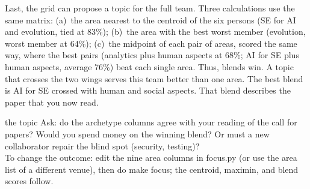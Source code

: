 Last, the grid can propose a topic for the full team.
Three calculations use the same matrix: (a)~the area nearest to the
centroid of the six persons (SE for AI and evolution, tied at 83\%);
(b)~the area with the best worst member (evolution, worst member at
64\%); (c)~the midpoint of each pair of areas, scored the same way,
where the best pairs (analytics plus human aspects at 68\%; AI for SE
plus human aspects, average 76\%) beat each single area.
Thus, blends win.
A topic that crosses the two wings serves this team better than one
area.
The best blend is AI for SE crossed with human and social aspects.
That blend describes the paper that you now read.

\begin{pause}{the topic}
Ask: do the archetype columns agree with your reading of the call for
papers?
Would you spend money on the winning blend?
Or must a new collaborator repair the blind spot (security,
testing)?\\[0.2em] To change the outcome: edit the nine area columns
in {\ttfamily focus.py} (or use the area list of a different venue),
then do {\ttfamily make focus}; the centroid, maximin, and blend
scores follow.
\end{pause}
